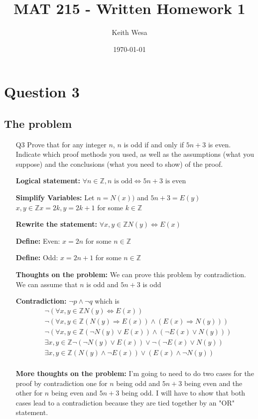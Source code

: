 \documentclass{article}
\author{Keith Wesa}
\title{MAT 215 - Written Homework 1}
\date{\today}
\begin{document}
\section*{Question 3}
\subsection*{The problem}
\begin{itemize}
    \item[Q3] Prove that for any integer $n$, $n$ is odd if and only if $5n +3$ is even.
    Indicate which proof methods you used, as well as the assumptions (what you suppose)
    and the conclusions (what you need to show) of the proof.
    \item[] \textbf{Logical statement:} $\forall n \in \mathbb{Z}, n \text{ is odd} \Leftrightarrow 5n + 3 \text{ is even}$
    \item[] \textbf{Simplify Variables:} Let $n = N(x))$ and $5n + 3 = E(y)$ $x, y \in \mathbb{Z} x=2k, y = 2k+1$ for some $k \in \mathbb{Z}$ 
    \item[] \textbf{Rewrite the statement:} $\forall x, y \in \mathbb{Z} N(y) \Leftrightarrow E(x)$
    \item[] \textbf{Define: } Even: $x = 2n$ for some $n \in \mathbb{Z}$
    \item[] \textbf{Define: } Odd: $x = 2n + 1$ for some $n \in \mathbb{Z}$
    \item[] \textbf{Thoughts on the problem: } We can prove this problem by contradiction. We can assume that $n$ is odd and $5n + 3$ is odd
    \item[] \textbf{Contradiction:} $\lnot p \land \lnot q$ which is
    \begin{equation*}
        \begin{aligned}
            &\lnot(\forall x, y \in \mathbb{Z} N(y) \Leftrightarrow E(x)) \\
            &\lnot(\forall x, y \in \mathbb{Z} (N(y) \Rightarrow E(x)) \land (E(x) \Rightarrow N(y))) \\
            &\lnot(\forall x, y \in \mathbb{Z} (\lnot N(y) \lor E(x)) \land (\lnot E(x) \lor N(y))) \\
            &\exists x, y \in \mathbb{Z} \lnot (\lnot N(y) \lor E(x)) \lor \lnot (\lnot E(x) \lor N(y)) \\
            &\exists x, y \in \mathbb{Z} (N(y) \land \lnot E(x)) \lor (E(x) \land \lnot N(y)) \\
        \end{aligned}
    \end{equation*}
    \item[] \textbf{More thoughts on the problem: } I'm going to need to do two cases for the proof by contradiction one for $n$ being odd and $5n + 3$ being even and the other for $n$ being even and $5n + 3$ being odd.
    I will have to show that both cases lead to a contradiction because they are tied together by an "OR" statement.
\end{itemize}
\end{document}
